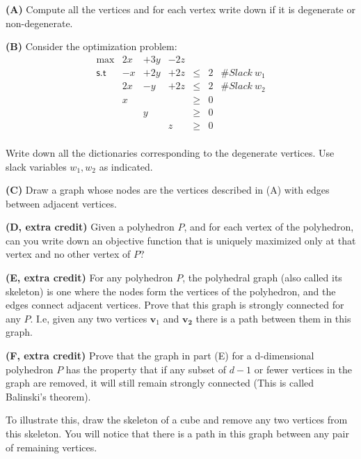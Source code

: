 \documentclass[11pt]{article}
\begin{document}
\noindent\textbf{(A)} Compute all the vertices and for each vertex
write down if it is degenerate or non-degenerate.

\noindent\textbf{(B)} Consider the optimization problem:
\[ \begin{array}{rcccccc}
\max & 2x & + 3y & - 2z \\
\mathsf{s.t} &  -x & + 2 y & + 2z & \leq & 2 & \# Slack\ w_1\\
& 2 x & - y & + 2z & \leq & 2 & \# Slack\ w_2\\
& x & & & \geq & 0\\
& & y& & \geq & 0 \\
& & & z & \geq & 0 \\
\end{array}\]

Write down all the dictionaries corresponding to the degenerate
vertices. Use slack variables $w_1, w_2$ as indicated.

\noindent\textbf{(C)} Draw a graph whose nodes are the vertices
described in (A) with edges between adjacent vertices. 

\medskip

\noindent\textbf{(D, extra credit)} Given a polyhedron $P$, and for
each vertex of the polyhedron,  can you  write down an
objective function that is uniquely maximized only at that vertex and
no other vertex of $P$? 


\medskip

\noindent\textbf{(E, extra credit)} For any polyhedron $P$, the
polyhedral graph (also called its skeleton) is one where the nodes
form the vertices of the polyhedron, and the edges connect adjacent
vertices. Prove that this graph is strongly connected for any
$P$. I.e, given any two vertices $\mathbf{v}_1$ and $\mathbf{v_2}$
there is a path between them in this graph.

\medskip

\noindent\textbf{(F, extra credit)}  Prove that the graph in part (E)
for a d-dimensional polyhedron $P$ has the property that if any subset
of $d-1$ or fewer vertices in the graph are removed, it will still
remain strongly connected (This is called Balinski's theorem).

To illustrate this, draw the skeleton of a cube and remove any two
vertices from this skeleton. You will notice that there is a path in
this graph between any pair of remaining vertices.
\end{document}
